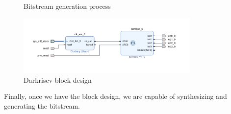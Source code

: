 \begin{figure}[h]
    \centering
    \caption{Bitstream generation process}
    \label{fig:bitstream_gen}
\end{figure}

\begin{figure}[h]
  \centering
  \includegraphics[width=0.8\textwidth]{../presentation/images/block-design.png}
  \caption{Darkriscv block design}
  \label{fig:block_design}
\end{figure}

Finally, once we have the block design, we are capable of synthesizing and generating the bitstream. 

